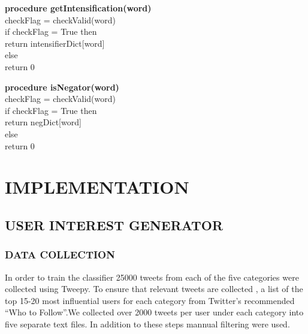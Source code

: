\textbf{procedure getIntensification(word)} \\
\indent checkFlag = checkValid(word) \\
\indent if checkFlag = True then \\
\indent \indent return intensifierDict[word] \\
\indent else \\
\indent \indent return 0

\textbf{procedure isNegator(word)} \\
\indent checkFlag = checkValid(word) \\
\indent if checkFlag = True then \\
\indent \indent return negDict[word] \\
\indent else \\
\indent \indent return 0 \\

\chapter{IMPLEMENTATION}
\indent 
\section{USER INTEREST GENERATOR}
\subsection{DATA COLLECTION}
\par In order to train the classifier 25000 tweets from each of the five categories were collected using Tweepy. To ensure that relevant tweets are collected , a  list of the top 15-20 most influential users for each category from Twitter’s recommended “Who to Follow”.We collected over 2000 tweets per user under each category into five separate text files. In addition to these steps mannual filtering were used.
\vspace{1cm}
